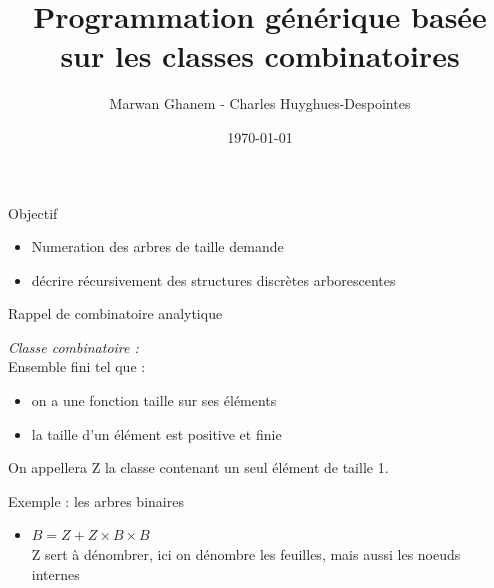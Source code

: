 \documentclass{beamer}
\title{Programmation générique basée sur les classes combinatoires}
\author{Marwan Ghanem - Charles Huyghues-Despointes}
\date{\today}
\begin{document}
\maketitle





\begin{frame}{Objectif}

\begin{itemize}
\item Numeration des arbres de taille demande
\item décrire récursivement des structures discrètes arborescentes
\end{itemize}

\end{frame}





\begin{frame}{Rappel de combinatoire analytique}
\begin{definition}
\emph{Classe combinatoire :} \\
Ensemble fini tel que : \\
\begin{itemize}
\item on a une fonction taille sur ses éléments
\item la taille d'un élément est positive et finie
\end{itemize}

On appellera Z la classe contenant un seul élément de taille 1.
\end{definition}
\begin{block}{Exemple : les arbres binaires}
\begin{itemize}
\item $B = Z + Z \times B \times B$ \\
Z sert à dénombrer,
ici on dénombre les feuilles, mais aussi les noeuds internes
\end{itemize}
\end{block}
\end{frame}
\end{document}
